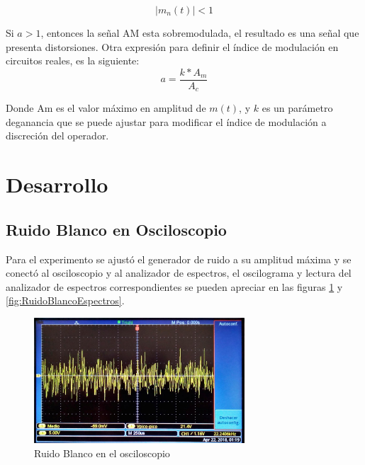 \documentclass{article}
\begin{document}
\begin{equation}
    |m_n(t)|<1
\end{equation}

Si $a > 1$, entonces la señal AM esta sobremodulada, el resultado es una señal que presenta distorsiones. Otra expresión para definir el índice de modulación en circuitos reales, es la siguiente:\citep{IndiceModulacion}\\

\begin{equation}
    a=\frac{k*A_m}{A_c}
\end{equation}

Donde Am es el valor máximo en amplitud de $m(t)$, y $k$ es un parámetro deganancia que se puede ajustar para modificar el índice de modulación a discreción del operador.\citep{IndiceModulacion}\\


\section{Desarrollo}





\subsection{Ruido Blanco en Osciloscopio}

Para el experimento se ajustó el generador de ruido a su amplitud máxima y se conectó al osciloscopio y al analizador de espectros, el oscilograma y lectura del analizador de espectros correspondientes se pueden apreciar en las figuras \ref{fig:RuidoBlanco} y \ref{fig:RuidoBlancoEspectros}.\\

\begin{figure}[h!]
    \centering
    \includegraphics[width=0.7\textwidth]{Imagenes/RuidoBlanco.jpg}
   
    \caption{Ruido Blanco en el osciloscopio}
    \label{fig:RuidoBlanco}
\end{figure}
\end{document}
